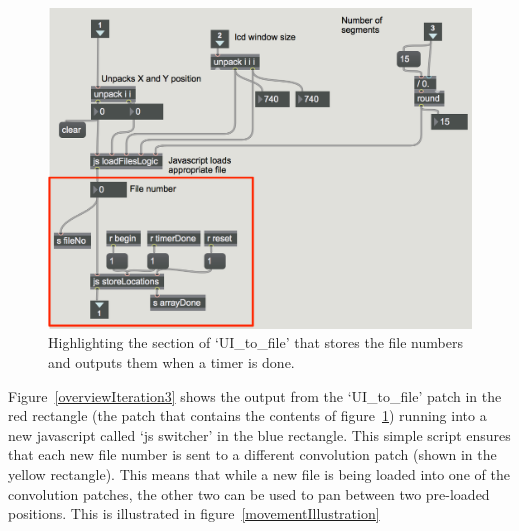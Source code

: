 \documentclass[../../main.tex]{subfiles}
\begin{document}

			\begin{figure}[H]
				\centerline{\includegraphics[scale = 0.6]{Sections/Implementation/Max/images/Max/Iteration3/storeLocations_edit.png}}
				\caption{Highlighting the section of `UI\_to\_file' that stores the file numbers and outputs them when a timer is done.}
				\label{storeLocations}
			\end{figure}

			Figure~\ref{overviewIteration3} shows the output from the `UI\_to\_file' patch in the red rectangle (the patch that contains the contents of figure~\ref{storeLocations}) running into a new javascript called `js switcher' in the blue rectangle. This simple script ensures that each new file number is sent to a different convolution patch (shown in the yellow rectangle). This means that while a new file is being loaded into one of the convolution patches, the other two can be used to pan between two pre-loaded positions. This is illustrated in figure~\ref{movementIllustration}\\
\end{document}
